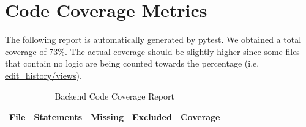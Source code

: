 \documentclass[12pt, titlepage]{article}
\begin{document}
\section{Code Coverage Metrics}
The following report is automatically generated by pytest. We obtained a total coverage of 73\%. The actual coverage should be slightly higher since some files that contain no logic are being counted towards the percentage (i.e. \href{https://github.com/thaafei/DomainX/blob/main/src/backend/api/database/edit_history/views.py}{edit\_history/views}).

\begin{landscape}
\centering
\begin{longtable}{|p{10cm}|c|c|c|c|}
    \caption{Backend Code Coverage Report} \\
    \hline
    \textbf{File} & \textbf{Statements} & \textbf{Missing} & \textbf{Excluded} & \textbf{Coverage} \\
    \hline
    \endfirsthead


\end{longtable}
\end{landscape}
\end{document}
